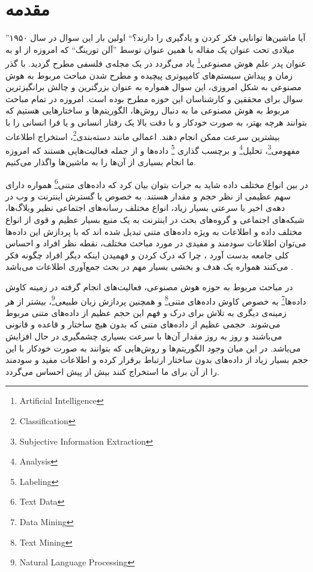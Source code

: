 \setcounter{page}{2}
\chapter{مقدمه}
\label{chap1}
''آیا ماشین‌ها توانایی فکر کردن و یادگیری را دارند؟`` اولین بار این سوال در سال ۱۹۵۰ میلادی تحت عنوان یک مقاله با همین عنوان توسط ''آلن تورینگ`` 
که امروزه از او به عنوان پدر علم هوش مصنوعی\footnote{Artificial Intelligence}
یاد می‌‌گردد در یک مجله‌ی فلسفی‌ مطرح گردید. با گذر زمان و پیداش سیستم‌های کامپیوتری پیچیده و مطرح شدن مباحث مربوط به هوش مصنوعی به شکل امروزی، این سوال همواره به عنوان بزرگترین و چالش برانگیزترین سوال برای محققین و کارشناسان این حوزه مطرح بوده است. امروزه در تمام مباحث مربوط به هوش مصنوعی ما به دنبال روش‌ها، الگوریتم‌ها و ساختارهایی هستیم که بتوانند هرچه بهتر، به صورت خودکار و با دقت بالا یک  رفتار انسانی‌ و یا فرا انسانی‌ را با بیشترین سرعت ممکن انجام دهند. اعمالی مانند دسته‌بندی\footnote{Classification}،
 استخراج اطلاعات مفهومی‌\footnote{Subjective Information Extraction}،
  تحلیل\footnote{Analysis}
   و برچسب گذاری \footnote{Labeling}
   داده‌ها و از جمله فعالیت‌هایی‌ هستند که امروزه ما انجام بسیاری از آن‌ها را به ماشین‌ها واگذار می‌‌کنیم. 

در بین انواع مختلف داده شاید به جرات بتوان بیان کرد که داده‌های متنی\footnote{Text Data}
همواره  دارای سهم عظیمی‌ از نظر حجم و مقدار هستند. به خصوص با گسترش اینترنت  و وب در دهه‌ی اخیر با سرعتی‌ بسیار زیاد، انواع مختلف رسانه‌های اجتماعی نظیر وبلاگ‌ها، شبکه‌های اجتماعی و گروه‌های بحث در اینترنت به یک منبع بسیار عظیم و قوی از انواع مختلف داده و اطلاعات به  ویژه داده‌‌های  متنی تبدیل شده اند که با پردازش این داده‌ها می‌‌توان اطلاعات سودمند و مفیدی در مورد مباحث مختلف، نقطه نظر افراد و احساس کلی‌ جامعه بدست آورد
\cite{lin2012weakly}،
چرا که درک کردن و فهمیدن اینکه دیگر افراد چگونه فکر می‌‌کنند همواره یک هدف و بخشی بسیار مهم در بحث جمع‌آوری اطلاعات می‌‌باشد
\cite{pang2008opinion}.

در مباحث مربوط به حوزه هوش مصنوعی، فعالیت‌های انجام گرفته در زمینه کاوش داده‌ها\footnote{Data Mining}
به خصوص کاوش داده‌های متنی\footnote{Text Mining}
و همچنین پردازش زبان طبیعی\footnote{Natural Language Processing}،
 بیشتر از هر زمینه‌ی دیگری به تلاش برای درک و فهم این حجم عظیم از داده‌های متنی مربوط می‌‌شوند. حجمی عظیم از داده‌های متنی که بدون هیچ ساختار و قاعده و قانونی‌ می‌‌باشند و روز به روز مقدار آن‌ها با سرعت بسیاری چشمگیری در حال افزایش می‌‌باشد. در این میان وجود الگوریتم‌ها و روش‌هایی که بتوانند به صورت خودکار با این حجم بسیار زیاد از داده‌های بدون ساختار ارتباط برقرار کرده و اطلاعات مفید و سودمند را از آن برای ما استخراج کنند بیش از پیش احساس می‌‌گردد.

